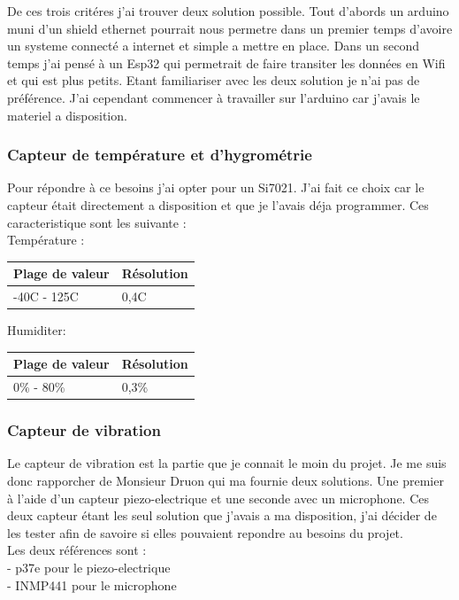 \documentclass[5pt]{article}
\begin{document}
De ces trois critéres j'ai trouver deux solution possible. 
Tout d'abords un arduino muni d'un shield ethernet pourrait nous permetre dans un premier temps d'avoire un systeme 
connecté a internet et simple a mettre en place.
Dans un second temps j'ai pensé à un Esp32 qui permetrait de faire transiter les données en Wifi et qui est plus petits. 
Etant familiariser avec les deux solution je n'ai pas de préférence. J'ai cependant commencer à travailler sur l'arduino car j'avais
le materiel a disposition.

\subsubsection{Capteur de température et d'hygrométrie }
Pour répondre à ce besoins j'ai opter pour un Si7021. J'ai fait ce choix car le capteur était directement a disposition et que je l'avais déja programmer. Ces caracteristique sont les suivante :\\
Température :\\
\begin{center}
    \begin{tabular}{|l|l|}
	\hline
	    Plage de valeur & Résolution \\
	\hline
	    -40C - 125C & 0,4C \\
	\hline
    \end{tabular}
\end{center}


Humiditer:\\
\begin{center}
    \begin{tabular}{|l|l|}
	\hline
	    Plage de valeur & Résolution \\
	\hline
	    0\% - 80\% & 0,3\% \\
	\hline
    \end{tabular}
\end{center}

\subsubsection{Capteur de vibration}
Le capteur de vibration est la partie que je connait le moin du projet. Je me suis donc rapporcher de Monsieur Druon qui ma fournie deux solutions.
 Une premier à l'aide d'un capteur piezo-electrique et une seconde avec un  microphone. Ces deux capteur étant les seul solution que j'avais a ma disposition, 
 j'ai décider de les tester afin de savoire si elles pouvaient repondre au besoins du projet.\\
Les deux références sont :\\
- p37e pour le piezo-electrique\\
- INMP441 pour le microphone\\
\end{document}
